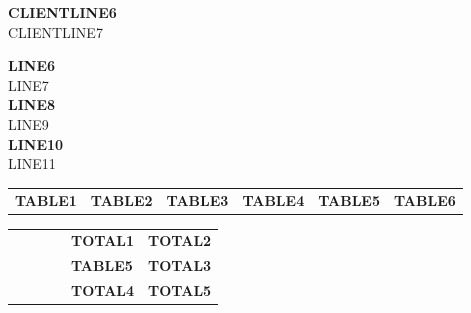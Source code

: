 \documentclass[a4paper]{article}
\newcommand{\lline}[2]{{\color{#1}\noindent\makebox[\linewidth][c]{\rule{1.02\textwidth}{#2}}}}
\begin{document}
    \vspace*{10pt} %
    \noindent
    \begin{minipage}[b]{0.5\textwidth}
        \vspace{0pt} %
        \begin{flushleft}
            \normalsize{\textbf{CLIENTLINE6}} \\
            \normalsize{CLIENTLINE7}
        \end{flushleft}
    \end{minipage}
    \hfill
    \begin{minipage}[b]{0.3\textwidth}
        \vspace{0pt} %
        \begin{flushright}
            \normalsize{\textbf{LINE6}} \\
            \normalsize{LINE7} \\
            \normalsize{\textbf{LINE8}} \\
            \normalsize{LINE9} \\
            \normalsize{\textbf{LINE10}} \\
            \normalsize{LINE11} \\
        \end{flushright}
    \end{minipage}

    \vspace*{20pt} %
    \noindent

    \begin{tabularx}{\linewidth}{
            >{\hsize=1.5\hsize}X
            >{\hsize=0.75\hsize}X
            >{\hsize=1\hsize}X
            >{\hsize=1\hsize}X
            >{\hsize=0.75\hsize}X
            >{\raggedleft\arraybackslash\hsize=1\hsize}X}
        \textbf{TABLE1} & \textbf{TABLE2} & \textbf{TABLE3} & \textbf{TABLE4} & \textbf{TABLE5} & \textbf{TABLE6}
    \end{tabularx}
    \vspace*{-10pt}
    \lline{blue}{0.8pt}

    \vspace*{10pt}

    \begin{tabularx}{\linewidth}{
            >{\hsize=1\hsize}X
            >{\hsize=1\hsize}X
            >{\hsize=1\hsize}X
            >{\hsize=1\hsize}X
            >{\raggedleft\arraybackslash\hsize=1\hsize}X
            >{\raggedleft\arraybackslash\hsize=1\hsize}X}
        &&&& \textbf{TOTAL1} & \textbf{TOTAL2} \\[2pt]
        &&&& \textbf{TABLE5} & \textbf{TOTAL3} \\[2pt]
        &&&& \textbf{TOTAL4} & \textbf{TOTAL5} \\[2pt]
    \end{tabularx}
\end{document}
